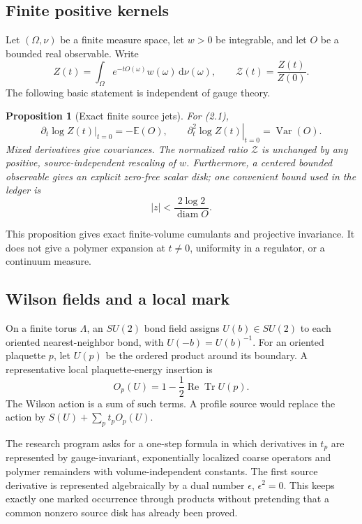 \documentclass[11pt]{article}
\newtheorem{proposition}[theorem]{Proposition}
\theoremstyle{definition}
\newcommand{\E}{\mathbb E}
\newcommand{\dd}{\mathrm d}
\begin{document}
\subsection{Finite positive kernels}

Let \((\Omega,\nu)\) be a finite measure space, let \(w>0\) be integrable,
and let \(O\) be a bounded real observable.  Write
\[
Z(t)=\int_\Omega e^{-tO(\omega)}w(\omega)\,\dd\nu(\omega),
\qquad
\mathcal Z(t)=\frac{Z(t)}{Z(0)}.
\tag{2.1}
\]
The following basic statement is independent of gauge theory.

\begin{proposition}[Exact finite source jets]
\label{prop:source-jets}
For (2.1),
\[
\left.\partial_t\log Z(t)\right|_{t=0}=-\E(O),
\qquad
\left.\partial_t^2\log Z(t)\right|_{t=0}
=\operatorname{Var}(O).
\tag{2.2}
\]
Mixed derivatives give covariances.  The normalized ratio \(\mathcal Z\) is
unchanged by any positive, source-independent rescaling of \(w\).
Furthermore, a centered bounded observable gives an explicit zero-free
scalar disk; one convenient bound used in the ledger is
\[
|z|<\frac{2\log 2}{\operatorname{diam}O}.
\tag{2.3}
\]
\end{proposition}

This proposition gives exact finite-volume cumulants and projective
invariance.  It does not give a polymer expansion at \(t\ne0\), uniformity
in a regulator, or a continuum measure.

\subsection{Wilson fields and a local mark}

On a finite torus \(\Lambda\), an \(SU(2)\) bond field assigns
\(U(b)\in SU(2)\) to each oriented nearest-neighbor bond, with
\(U(-b)=U(b)^{-1}\).  For an oriented plaquette \(p\), let \(U(p)\) be the
ordered product around its boundary.  A representative local
plaquette-energy insertion is
\[
O_p(U)=1-\frac12\operatorname{Re}\operatorname{Tr}U(p).
\tag{2.4}
\]
The Wilson action is a sum of such terms.  A profile source would replace
the action by \(S(U)+\sum_p t_pO_p(U)\).

The research program asks for a one-step formula in which derivatives in
\(t_p\) are represented by gauge-invariant, exponentially localized
coarse operators and polymer remainders with volume-independent constants.
The first source derivative is represented algebraically by a dual number
\(\epsilon\), \(\epsilon^2=0\).  This keeps exactly one marked occurrence
through products without pretending that a common nonzero source disk has
already been proved.
\end{document}
